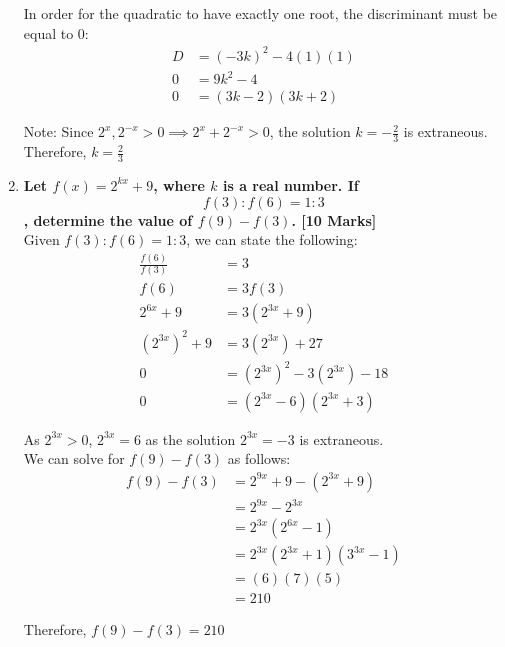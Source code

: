 \documentclass[12pt]{article}
\begin{document}
\begin{enumerate}
    In order for the quadratic to have exactly one root, the discriminant must be equal to $0$:
    \begin{align*}
        D &= (-3k)^2 -4(1)(1) \\
        0 & = 9k^2 -4 \\
        0 & = (3k - 2)(3k + 2)
    \end{align*}
    
    Note: Since $2^x, 2^{-x} > 0 \implies 2^x + 2^{-x} > 0$, the solution $k = -\frac{2}{3}$ is extraneous. \\
    
    Therefore, $k = \frac{2}{3}$
    
    \item \textbf{Let $f(x) = 2^{kx} + 9$, where $k$ is a real number. If $$f(3):f(6) = 1:3$$, determine the value of $f(9) - f(3)$. [10 Marks]} \\

    Given $f(3):f(6) = 1:3$, we can state the following:
    \begin{align*}
        \frac{f(6)}{f(3)} &= 3 \\
        f(6) &= 3f(3) \\
        2^{6x} + 9 &= 3(2^{3x} + 9) \\
        (2^{3x})^2 + 9 &= 3 (2^{3x}) + 27 \\
        0 &= (2^{3x})^2 - 3(2^{3x}) - 18 \\
        0 &= (2^{3x} - 6)(2^{3x} + 3)
    \end{align*}

    As $2^{3x} > 0$, $2^{3x} = 6$ as the solution $2^{3x} = -3$ is extraneous. \\
    
    We can solve for $f(9) - f(3)$ as follows:
    \begin{align*}
         f(9) - f(3) &= 2^{9x} + 9 - (2^{3x} + 9) \\
          &= 2^{9x} - 2^{3x} \\
          &= 2^{3x}(2^{6x} - 1) \\
          &= 2^{3x}(2^{3x} + 1)(3^{3x} - 1) \\
          &= (6)(7)(5) \\
          &= 210
    \end{align*}

    Therefore, $f(9) - f(3) = 210$
    
\end{enumerate}
\end{document}
